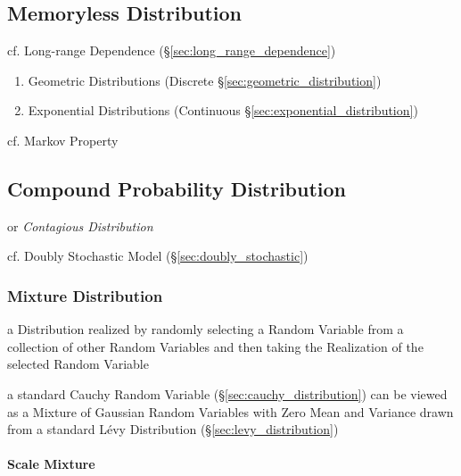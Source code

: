 \subsection{Memoryless Distribution}\label{sec:memoryless_distribution}

cf. Long-range Dependence (\S\ref{sec:long_range_dependence})

\begin{enumerate}
  \item Geometric Distributions (Discrete \S\ref{sec:geometric_distribution})
  \item Exponential Distributions (Continuous
    \S\ref{sec:exponential_distribution})
\end{enumerate}

cf. Markov Property



\subsection{Compound Probability Distribution}
\label{sec:compound_probability}

or \emph{Contagious Distribution}

cf. Doubly Stochastic Model (\S\ref{sec:doubly_stochastic})



\subsubsection{Mixture Distribution}\label{sec:mixture_distribution}

a Distribution realized by randomly selecting a Random Variable from a
collection of other Random Variables and then taking the Realization of the
selected Random Variable

a standard Cauchy Random Variable (\S\ref{sec:cauchy_distribution}) can be
viewed as a Mixture of Gaussian Random Variables with Zero Mean and Variance
drawn from a standard L\'evy Distribution (\S\ref{sec:levy_distribution})



\paragraph{Scale Mixture}\label{sec:scale_mixture}\hfill


